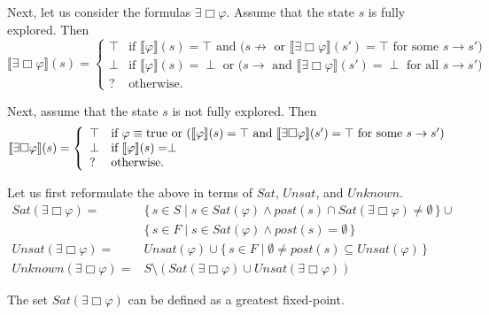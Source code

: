 \documentclass[12pt]{article}
\newcommand{\always}{\Box}
\newcommand{\TRUE}{\mbox{\lstinline{true}}}
\theoremstyle{definition}
\newcommand{\satisfaction}[1]{\llbracket #1 \rrbracket}
\begin{document}
Next, let us consider the formulas $\exists \always \varphi$.  Assume that the state $s$ is fully explored.  Then 
\[
\satisfaction{\exists \always \varphi}(s) = \left \{
\begin{array}{ll}
\top & \mbox{if $\satisfaction{\varphi}(s) = \top$ and ($s \not\rightarrow$ or $\satisfaction{\exists \always \varphi}(s') = \top$ for some $s \rightarrow s'$)}\\
\perp & \mbox{if $\satisfaction{\varphi}(s) = \perp$ or ($s \rightarrow$ and $\satisfaction{\exists \always \varphi}(s') = \perp$ for all $s \rightarrow s'$)}\\
? & \mbox{otherwise.}
\end{array}
\right .
\]

Next, assume that the state $s$ is not fully explored.  Then
\[
\satisfaction{\exists \always \varphi}(s) = \left \{
\begin{array}{ll}
\top & \mbox{if $\varphi \equiv \TRUE$ or ($\satisfaction{\varphi}(s) = \top$ and $\satisfaction{\exists \always \varphi}(s') = \top$ for some $s \rightarrow s'$)}\\
\perp & \mbox{if $\satisfaction{\varphi}(s) = \perp$}\\
? & \mbox{otherwise.}
\end{array}
\right .
\]

Let us first reformulate the above in terms of $\mathit{Sat}$, $\mathit{Unsat}$, and $\mathit{Unknown}$.  
\begin{align*}
\mathit{Sat}(\exists \always \varphi) = & 
\{\, s \in S \mid s \in \mathit{Sat}(\varphi) \wedge \mathit{post}(s) \cap \mathit{Sat}(\exists \always \varphi) \not= \emptyset \,\} \cup\\
& \{\, s \in F \mid s \in \mathit{Sat}(\varphi) \wedge \mathit{post}(s) = \emptyset \,\}\\
\mathit{Unsat}(\exists \always \varphi) = & 
\mathit{Unsat}(\varphi) \cup \{\, s \in F \mid \emptyset \not= \mathit{post}(s) \subseteq \mathit{Unsat}(\varphi) \,\}\\
\mathit{Unknown}(\exists \always \varphi) = & S \setminus (\mathit{Sat}(\exists \always \varphi) \cup \mathit{Unsat}(\exists \always \varphi))
\end{align*}

The set $\mathit{Sat}(\exists \always \varphi)$ can be defined as a greatest fixed-point.  

\color{black}
\end{document}
